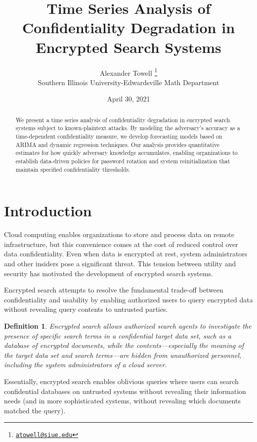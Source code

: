 \documentclass[final,11pt]{article}
\title{Time Series Analysis of Confidentiality Degradation in Encrypted Search Systems}
\author{Alexander Towell \thanks{\href{mailto:atowell@siue.edu}{\nolinkurl{atowell@siue.edu}}} \\ Southern Illinois University-Edwardsville Math Department}
\date{April 30, 2021}
\theoremstyle{plain}
\newtheorem{definition}{Definition}
\theoremstyle{remark}
\begin{document}
\maketitle
\begin{abstract}
We present a time series analysis of confidentiality degradation in
encrypted search systems subject to known-plaintext attacks. By modeling
the adversary's accuracy as a time-dependent confidentiality measure, we
develop forecasting models based on ARIMA and dynamic regression techniques.
Our analysis provides quantitative estimates for how quickly adversary
knowledge accumulates, enabling organizations to establish data-driven
policies for password rotation and system reinitialization that maintain
specified confidentiality thresholds.
\end{abstract}

{
\setcounter{tocdepth}{3}
\tableofcontents
}
\hypertarget{introduction}{%
\section{Introduction}\label{introduction}}

Cloud computing enables organizations to store and process data on remote
infrastructure, but this convenience comes at the cost of reduced control
over data confidentiality. Even when data is encrypted at rest, system
administrators and other insiders pose a significant threat. This tension
between utility and security has motivated the development of encrypted
search systems.

Encrypted search attempts to resolve the fundamental trade-off between
confidentiality and usability by enabling authorized users to query
encrypted data without revealing query contents to untrusted parties.

\begin{definition}
Encrypted search allows authorized search agents to investigate the presence
of specific search terms in a confidential target data set, such as a database
of encrypted documents, while the contents---especially the meaning of the target
data set and search terms---are hidden from unauthorized personnel, including
the system administrators of a cloud server.
\end{definition}

Essentially, encrypted search enables oblivious queries where users can
search confidential databases on untrusted systems without revealing their
information needs (and in more sophisticated systems, without revealing which
documents matched the query).
\end{document}
